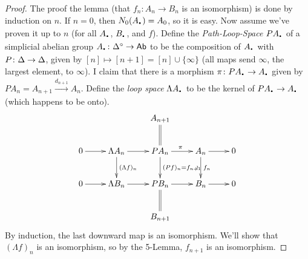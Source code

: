 \begin{proof}
The proof the lemma (that $f_n\colon A_n\to B_n$ is an isomorphism) is done by induction on $n$. If $n=0$, then $N_0(A_\udot)=A_0$, so it is easy. Now assume we've proven it up to $n$ (for all $A_\udot$, $B_\udot$, and $f$). Define the \emph{Path-Loop-Space} $PA_\udot$ of a simplicial abelian group $A_\udot\colon \DDelta^\circ\to \ab$ to be the composition of $A_\udot$ with $P\colon \Delta\to \Delta$, given by $[n]\mapsto [n+1]=[n]\cup \{\infty\}$ (all maps send $\infty$, the largest element, to $\infty$). I claim that there is a morphism $\pi\colon PA_\udot\to A_\udot$ given by $PA_n=A_{n+1}\xrightarrow{d_{n+1}}A_n$. Define the \emph{loop space} $\Lambda A_\udot$ to be the kernel of $PA_\udot\to A_\udot$ (which happens to be onto).
\[\xymatrix{
 & & A_{n+1}\ar@{=}[d]\\
 0\ar[r] & \Lambda A_n\ar[d]^{(\Lambda f)_n} \ar[r] & PA_n\ar[r]^\pi \ar[d]^{(Pf)_n=f_{n+1}} & A_n\ar[r]\ar[d]^{f_n}_\wr & 0\\
 0\ar[r] & \Lambda B_n \ar[r] & PB_n \ar[r] & B_n\ar[r] & 0\\
 & & B_{n+1}\ar@{=}[u]
}\]
By induction, the last downward map is an isomorphism. We'll show that $(\Lambda f)_n$ is an isomorphism, so by the 5-Lemma, $f_{n+1}$ is an isomorphism.
\end{proof}






